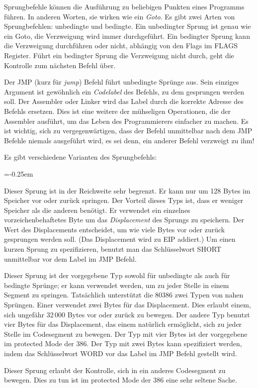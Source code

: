 Sprungbefehle k\"{o}nnen die Ausf\"{u}hrung zu beliebigen Punkten eines
Programms f\"{u}hren. In anderen Worten, sie wirken wie ein \emph{Goto}.
Es gibt zwei Arten von Sprungbefehlen: unbedingte und bedingte. Ein
unbedingter Sprung ist genau wie ein Goto, die Verzweigung wird
immer durchgef\"{u}hrt. Ein bedingter Sprung kann die Verzweigung
durchf\"{u}hren oder nicht, abh\"{a}ngig von den Flags im FLAGS Register.
F\"{u}hrt ein bedingter Sprung die Verzweigung nicht durch, geht die
Kontrolle zum n\"{a}chsten Befehl \"{u}ber.

 Der {\code JMP} (kurz f\"{u}r \emph{jump})
Befehl f\"{u}hrt unbedingte Spr\"{u}nge  aus.
Sein einziges Argument ist gew\"{o}hnlich ein \emph{Codelabel} des
Befehls, zu dem gesprungen werden soll. Der Assembler oder Linker
wird das Label durch die korrekte Adresse des Befehls ersetzen. Dies
ist eine weitere der m\"{u}hseligen Operationen, die der Assembler
ausf\"{u}hrt, um das Leben des Programmierers einfacher zu machen. Es
ist wichtig, sich zu vergegenw\"{a}rtigen, dass der Befehl unmittelbar
nach dem {\code JMP} Befehle niemals ausgef\"{u}hrt wird, es sei denn,
ein anderer Befehl verzweigt zu ihm!

Es gibt verschiedene Varianten des Sprungbefehls:
\begin{description}
\parskip=-0.25em %

\item[SHORT]
Dieser Sprung ist in der Reichweite sehr begrenzt. Er kann nur um
128 Bytes im Speicher vor oder zur\"{u}ck springen. Der Vorteil dieses
Typs ist, dass er weniger Speicher als die anderen ben\"{o}tigt. Er
verwendet ein einzelnes vorzeichenbehaftetes Byte um das
\emph{Displacement} des Sprungs zu speichern. Der Wert des
Displacements entscheidet, um wie viele Bytes vor oder zur\"{u}ck
gesprungen werden soll. (Das Displacement wird zu EIP addiert.) Um
einen kurzen Sprung zu spezifizieren, benutzt man das Schl\"{u}sselwort
{\code SHORT} unmittelbar vor dem Label im {\code JMP} Befehl.

\item[NEAR]
Dieser Sprung ist der vorgegebene Typ sowohl f\"{u}r unbedingte als auch
f\"{u}r bedingte Spr\"{u}nge; er kann verwendet werden, um zu jeder Stelle
in einem Segment zu springen. Tats\"{a}chlich unterst\"{u}tzt die 80386 zwei
Typen von nahen Spr\"{u}ngen. Einer verwendet zwei Bytes f\"{u}r das
Displacement. Dies erlaubt einem, sich ungef\"{a}hr 32\,000 Bytes vor
oder zur\"{u}ck zu bewegen. Der andere Typ benutzt vier Bytes f\"{u}r das
Displacement, das einem nat\"{u}rlich erm\"{o}glicht, sich zu jeder Stelle
im Codesegment zu bewegen. Der Typ mit vier Bytes ist der
vorgegebene im protected Mode der 386. Der Typ mit zwei Bytes kann
spezifiziert werden, indem das Schl\"{u}sselwort {\code WORD} vor das
Label im {\code JMP} Befehl gestellt wird.

\item[FAR]
Dieser Sprung erlaubt der Kontrolle, sich in ein anderes Codesegment
zu bewegen. Dies zu tun ist im protected Mode der 386 eine sehr
seltene Sache. 
\end{description}

